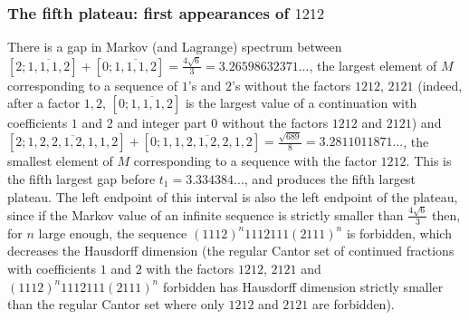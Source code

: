 \documentclass[10pt]{amsart}
\numberwithin{equation}{section}
\theoremstyle{definition}
\begin{document}
\subsubsection{The fifth plateau: first appearances of $1212$} 

There is a gap in Markov (and Lagrange) spectrum between
$[2;\overline{1,1,1,2}]+[0;\overline{1,1,1,2}]=\frac{4\sqrt{6}}{3}=3.26598632371...$,
the largest element of $M$ corresponding to a sequence of $1$'s and $2$'s
without the factors $1212$, $2121$ (indeed, after a factor $1,2$,
$[0;\overline{1,1,1,2}]$ is the largest value of a continuation with
coefficients $1$ and $2$ and integer part $0$ without the factors $1212$ and
$2121$) and
$[2;\overline{1,2,2,1,2,1,1,2}]+[0;\overline{1,1,2,1,2,2,1,2}]=\frac{\sqrt{689}}{8}=3.2811011871...$,
the smallest element of $M$ corresponding to a sequence with the factor $1212$.
This is the fifth largest gap before $t_1=3.334384...$, and produces the fifth
largest plateau. The left endpoint of this interval is also the left endpoint of
the plateau, since if the Markov value of an infinite sequence is strictly
smaller than $\frac{4\sqrt{6}}{3}$ then, for $n$ large enough, the sequence
$(1112)^n 1112111 (2111)^n$ is forbidden, which decreases the Hausdorff
dimension (the regular Cantor set of continued fractions with coefficients $1$
and $2$ with the factors $1212$, $2121$ and $(1112)^n 1112111 (2111)^n$
forbidden has Hausdorff dimension strictly smaller than the regular Cantor set
where only $1212$ and $2121$ are forbidden). 
\end{document}
